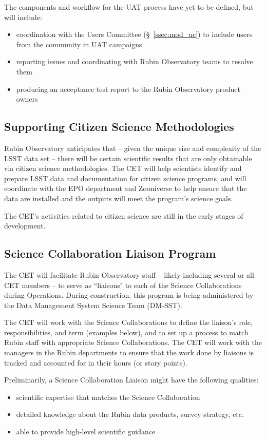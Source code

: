\documentclass[DM,lsstdraft,toc]{lsstdoc}
\begin{document}
The components and workflow for the UAT process have yet to be defined, but will include:
\begin{itemize}
\item coordination with the Users Committee (\S~\ref{ssec:mod_uc}) to include users from the community in UAT campaigns
\item reporting issues and coordinating with Rubin Observatory teams to resolve them
\item producing an acceptance test report to the Rubin Observatory product owners
\end{itemize}


\subsection{Supporting Citizen Science Methodologies}\label{ssec:mod_citizen}

Rubin Observatory anticipates that -- given the unique size and complexity of the LSST data set -- there will be certain scientific results that are only obtainable via citizen science methodologies.
The CET will help scientists identify and prepare LSST data and documentation for citizen science programs, and will coordinate with the EPO department and Zooniverse to help ensure that the data are installed and the outputs will meet the program's science goals.

The CET's activities related to citizen science are still in the early stages of development.


\subsection{Science Collaboration Liaison Program}\label{ssec:mod_liaisons}

The CET will facilitate Rubin Observatory staff -- likely including several or all CET members -- to serve as ``liaisons" to each of the Science Collaborations during Operations. 
During construction, this program is being administered by the Data Management System Science Team (DM-SST).

The CET will work with the Science Collaborations to define the liaison's role, responsibilities, and term (examples below), and to set up a process to match Rubin staff with appropriate Science Collaborations.
The CET will work with the managers in the Rubin departments to ensure that the work done by liaisons is tracked and accounted for in their hours (or story points). 

Preliminarily, a Science Collaboration Liaison might have the following qualities:
\begin{itemize}
\item scientific expertise that matches the Science Collaboration
\item detailed knowledge about the Rubin data products, survey strategy, etc. 
\item able to provide high-level scientific guidance 
\end{itemize}
\end{document}
